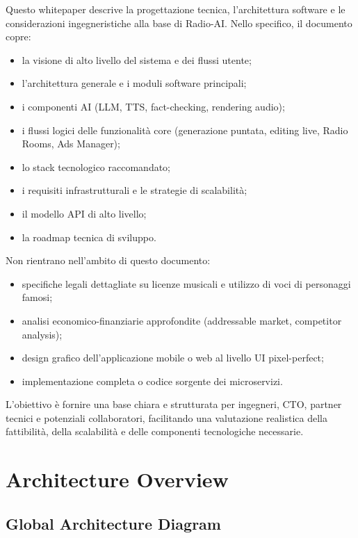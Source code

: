 \documentclass[11pt,a4paper]{article}
\begin{document}
Questo whitepaper descrive la progettazione tecnica, l’architettura software e le considerazioni ingegneristiche alla base di Radio-AI.  
Nello specifico, il documento copre:

\begin{itemize}
    \item la visione di alto livello del sistema e dei flussi utente;
    \item l’architettura generale e i moduli software principali;
    \item i componenti AI (LLM, TTS, fact-checking, rendering audio);
    \item i flussi logici delle funzionalità core (generazione puntata, editing live, Radio Rooms, Ads Manager);
    \item lo stack tecnologico raccomandato;
    \item i requisiti infrastrutturali e le strategie di scalabilità;
    \item il modello API di alto livello;
    \item la roadmap tecnica di sviluppo.
\end{itemize}

Non rientrano nell’ambito di questo documento:

\begin{itemize}
    \item specifiche legali dettagliate su licenze musicali e utilizzo di voci di personaggi famosi;
    \item analisi economico-finanziarie approfondite (addressable market, competitor analysis);
    \item design grafico dell’applicazione mobile o web al livello UI pixel-perfect;
    \item implementazione completa o codice sorgente dei microservizi.
\end{itemize}

L’obiettivo è fornire una base chiara e strutturata per ingegneri, CTO, partner tecnici e potenziali collaboratori, facilitando una valutazione realistica della fattibilità, della scalabilità e delle componenti tecnologiche necessarie.
\section{Architecture Overview}

\subsection{Global Architecture Diagram}
\end{document}
